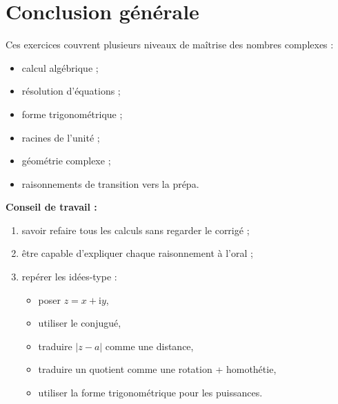 \documentclass[11pt,a4paper]{article}
\newcommand{\ii}{\mathrm{i}}
\begin{document}
\section*{Conclusion générale}

Ces exercices couvrent plusieurs niveaux de maîtrise des nombres complexes :
\begin{itemize}[label=--]
    \item calcul algébrique ;
    \item résolution d'équations ;
    \item forme trigonométrique ;
    \item racines de l'unité ;
    \item géométrie complexe ;
    \item raisonnements de transition vers la prépa.
\end{itemize}

\textbf{Conseil de travail :}
\begin{enumerate}
    \item savoir refaire tous les calculs sans regarder le corrigé ;
    \item être capable d'expliquer chaque raisonnement à l'oral ;
    \item repérer les idées-type :
    \begin{itemize}
        \item poser \(z=x+\ii y\),
        \item utiliser le conjugué,
        \item traduire \(|z-a|\) comme une distance,
        \item traduire un quotient comme une rotation + homothétie,
        \item utiliser la forme trigonométrique pour les puissances.
    \end{itemize}
\end{enumerate}
\end{document}
